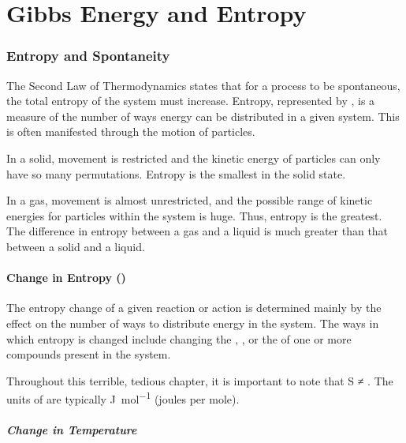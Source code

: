
\pagebreak
\part{Gibbs Energy and Entropy}

	\section{Entropy and Spontaneity}

		The Second Law of Thermodynamics states that for a process to be spontaneous, the total entropy of the system must increase. Entropy, represented by , is a measure of the number of ways energy can be distributed in a given system. This is often manifested through
		the motion of particles.

		In a solid, movement is restricted and the kinetic energy of particles can only have so many permutations. Entropy is the smallest in the
		solid state.

		In a gas, movement is almost unrestricted, and the possible range of kinetic energies for particles within the system is huge. Thus,
		entropy is the greatest. The difference in entropy between a gas and a liquid is much greater than that between a solid and a liquid.


		\subsection{Change in Entropy (\texorpdfstring{\entr{})}{\Delta S}}

			The entropy change of a given reaction or action is determined mainly by the effect on the number of ways to distribute energy in the
			system. The ways in which entropy is changed include changing the , , or the
			 of one or more compounds present in the system.

			Throughout this terrible, tedious chapter, it is important to note that
			S ≠ \entr{}. The units of \entr{} are typically \si{\joule\per\mole} (joules per mole).

			\pagebreak
			\subsubsection{Change in Temperature}

